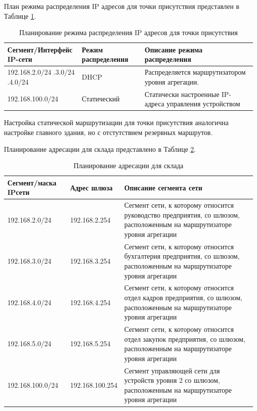 \documentclass[14pt, a4paper]{extarticle}
\numberwithin{equation}{section}
\begin{document}
План режима распределения IP адресов для точки присутствия представлен в Таблице \ref{table:tpDistributionPlan}.

\begin{table}[H]
\centering
\small
\caption{Планирование режима распределения IP адресов для точки присутствия}
\label{table:tpDistributionPlan}
\begin{tabular}{|p{4cm}|p{3cm}|p{8cm}|}
\hline
\textbf{Сегмент/Интерфейс IP-сети } & \textbf{Режим распределения} & \textbf{Описание режима распределения} 
\\ \hline
192.168.2.0/24 \newline
192.168.3.0/24 \newline
192.168.4.0/24 \newline
&
DHCP
&
Распределяется маршрутизатором уровня агрегации. 
\\ \hline
192.168.100.0/24 & Статический & Статически настроенные IP-адреса управления устройством 
\\ \hline
\end{tabular}
\end{table}

Настройка статической маршрутизации для точки присутствия аналогична настройке главного здания, но с отстутствием резервных маршрутов.



Планирование адресации для склада представлено в Таблице \ref{table:warehouseIpPlan}.
\begin{table}[H]
\centering
\small
\caption{Планирование адресации для склада}
\label{table:warehouseIpPlan}
\begin{tabular}{|m{4cm}|m{3cm}|m{8cm}|}
\hline
\textbf{Сегмент/маска IPсети} & \textbf{Адрес шлюза} & \textbf{Описание сегмента сети} \\
\hline
192.168.2.0/24 & 192.168.2.254 & Сегмент сети, к которому относится руководство предприятия, со шлюзом, расположенным на маршрутизаторе уровня агрегации
\\ \hline
192.168.3.0/24 & 192.168.3.254 & Сегмент сети, к которому относится бухгалтерия предприятия, со шлюзом, расположенным на маршрутизаторе уровня агрегации
\\ \hline
192.168.4.0/24 & 192.168.4.254 & Сегмент сети, к которому относится отдел кадров предприятия, со шлюзом, расположенным на маршрутизаторе уровня агрегации
\\ \hline
192.168.5.0/24 & 192.168.5.254 & Сегмент сети, к которому относится отдел закупок предприятия, со шлюзом, расположенным на маршрутизаторе уровня агрегации
\\ \hline
192.168.100.0/24 & 192.168.100.254 & Сегмент управляющей сети для устройств уровня 2 со шлюзом, расположенным на маршрутизаторе уровня агрегации 
\\ \hline
\end{tabular}
\end{table}
\end{document}
